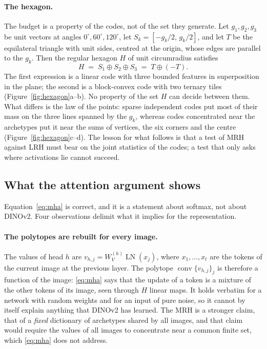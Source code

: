 \documentclass[sigconf,nonacm,screen]{acmart}
\newcommand{\conv}{\operatorname{conv}}
\newcommand{\LN}{\operatorname{LN}}
\newcommand{\msum}{\oplus}
\begin{document}
\paragraph{The hexagon.} The budget is a property of the codes, not of the set they generate. Let
$g_1,g_2,g_3$ be unit vectors at angles $0^\circ,60^\circ,120^\circ$, let $S_k=[-g_k/2,\,g_k/2]$, and let
$T$ be the equilateral triangle with unit sides, centred at the origin, whose edges are parallel to the
$g_k$. Then the regular hexagon $H$ of unit circumradius satisfies
\begin{equation}
  H \;=\; S_1\msum S_2\msum S_3 \;=\; T\msum(-T).
  \label{eq:hexagon}
\end{equation}
The first expression is a linear code with three bounded features in superposition in the plane; the
second is a block-convex code with two ternary tiles (Figure~\ref{fig:hexagon}a--b). No property of the set
$H$ can decide between them. What differs is the law of the points: sparse independent codes put most of
their mass on the three lines spanned by the $g_k$, whereas codes concentrated near the archetypes put it
near the sums of vertices, the six corners and the centre (Figure~\ref{fig:hexagon}c--d). The lesson for what follows is that a test
of MRH against LRH must bear on the joint statistics of the codes; a test that only asks where
activations lie cannot succeed.

\subsection{What the attention argument shows}
\label{sec:attention}

Equation~\eqref{eq:mha} is correct, and it is a statement about softmax, not about DINOv2. Four
observations delimit what it implies for the representation.

\paragraph{The polytopes are rebuilt for every image.} The values of head $h$ are $v_{h,j}=W_V^{(h)}\LN(x_j)$,
where $x_1,\dots,x_t$ are the tokens of the current image at the previous layer. The polytope
$\conv\{v_{h,j}\}_j$ is therefore a function of the image: \eqref{eq:mha} says that the update of a token
is a mixture of the other tokens of its image, seen through $H$ linear maps. It holds verbatim for a
network with random weights and for an input of pure noise, so it cannot by itself explain anything that
DINOv2 has learned. The MRH is a stronger claim, that of a \emph{fixed} dictionary of archetypes shared
by all images, and that claim would require the values of all images to concentrate near a common finite
set, which \eqref{eq:mha} does not address.
\end{document}
